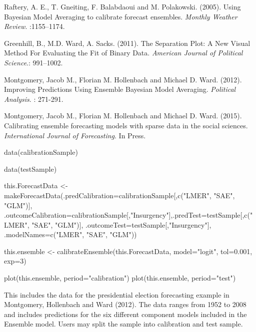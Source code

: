 \documentclass[a4paper]{book}
\begin{document}
%
\begin{References}\relax
Raftery, A. E., T. Gneiting, F. Balabdaoui and M. Polakowski. (2005). Using Bayesian Model Averaging to calibrate forecast ensembles. \emph{Monthly Weather Review}. :1155--1174.

Greenhill, B., M.D. Ward, A. Sacks. (2011). The Separation Plot: A New Visual Method For Evaluating the Fit of Binary Data. \emph{American Journal of Political Science}.: 991--1002.

Montgomery, Jacob M., Florian M. Hollenbach and Michael D. Ward. (2012). Improving Predictions Using Ensemble Bayesian Model Averaging. \emph{Political Analysis}. : 271-291.

Montgomery, Jacob M., Florian M. Hollenbach and Michael D. Ward. (2015). Calibrating ensemble forecasting models with sparse data in the social sciences.   \emph{International Journal of Forecasting}. In Press.
\end{References}
%
\begin{SeeAlso}\relax
{}
\end{SeeAlso}
%
\begin{Examples}
\begin{ExampleCode}
data(calibrationSample)

data(testSample)

this.ForecastData <- makeForecastData(.predCalibration=calibrationSample[,c("LMER", "SAE", "GLM")],
.outcomeCalibration=calibrationSample[,"Insurgency"],.predTest=testSample[,c("LMER", "SAE", "GLM")],
.outcomeTest=testSample[,"Insurgency"], .modelNames=c("LMER", "SAE", "GLM"))

this.ensemble <- calibrateEnsemble(this.ForecastData, model="logit", tol=0.001, exp=3)

plot(this.ensemble, period="calibration")
plot(this.ensemble, period="test")
\end{ExampleCode}
\end{Examples}
%
\begin{Description}\relax
This includes the data for the presidential election forecasting example in Montgomery, Hollenbach and Ward (2012). The data ranges from 1952 to 2008 and includes predictions for the six different component models included in the Ensemble model. Users may split the sample into calibration and test sample.
\end{Description}
%
\end{document}
